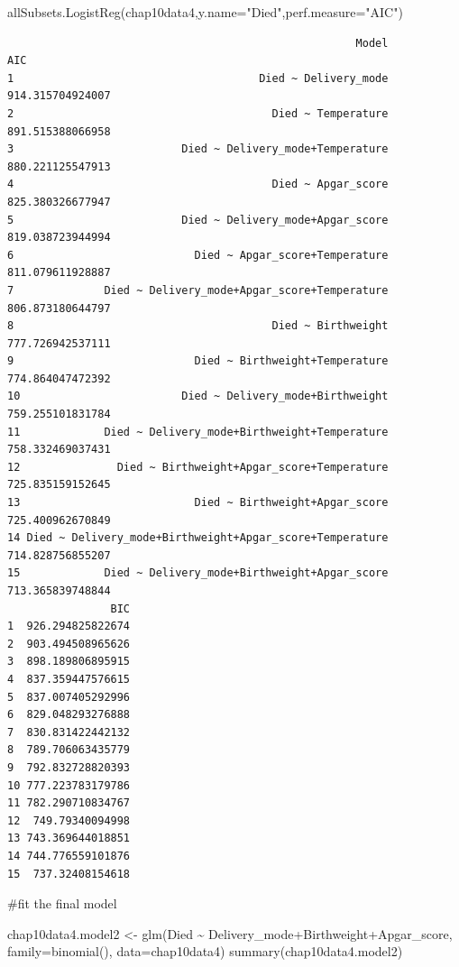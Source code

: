 \documentclass[
  letterpaper,
  DIV=11,
  numbers=noendperiod]{scrartcl}
\newenvironment{Shaded}{\begin{snugshade}}{\end{snugshade}}
\newcommand{\AttributeTok}[1]{\textcolor[rgb]{0.40,0.45,0.13}{#1}}
\newcommand{\FunctionTok}[1]{\textcolor[rgb]{0.28,0.35,0.67}{#1}}
\newcommand{\NormalTok}[1]{\textcolor[rgb]{0.00,0.23,0.31}{#1}}
\newcommand{\OtherTok}[1]{\textcolor[rgb]{0.00,0.23,0.31}{#1}}
\newcommand{\SpecialCharTok}[1]{\textcolor[rgb]{0.37,0.37,0.37}{#1}}
\newcommand{\StringTok}[1]{\textcolor[rgb]{0.13,0.47,0.30}{#1}}
\begin{document}
\begin{Shaded}
\begin{Highlighting}[]
\FunctionTok{allSubsets.LogistReg}\NormalTok{(chap10data4,}\AttributeTok{y.name=}\StringTok{"Died"}\NormalTok{,}\AttributeTok{perf.measure=}\StringTok{"AIC"}\NormalTok{)}
\end{Highlighting}
\end{Shaded}

\begin{verbatim}
                                                      Model              AIC
1                                      Died ~ Delivery_mode 914.315704924007
2                                        Died ~ Temperature 891.515388066958
3                          Died ~ Delivery_mode+Temperature 880.221125547913
4                                        Died ~ Apgar_score 825.380326677947
5                          Died ~ Delivery_mode+Apgar_score 819.038723944994
6                            Died ~ Apgar_score+Temperature 811.079611928887
7              Died ~ Delivery_mode+Apgar_score+Temperature 806.873180644797
8                                        Died ~ Birthweight 777.726942537111
9                            Died ~ Birthweight+Temperature 774.864047472392
10                         Died ~ Delivery_mode+Birthweight 759.255101831784
11             Died ~ Delivery_mode+Birthweight+Temperature 758.332469037431
12               Died ~ Birthweight+Apgar_score+Temperature 725.835159152645
13                           Died ~ Birthweight+Apgar_score 725.400962670849
14 Died ~ Delivery_mode+Birthweight+Apgar_score+Temperature 714.828756855207
15             Died ~ Delivery_mode+Birthweight+Apgar_score 713.365839748844
                BIC
1  926.294825822674
2  903.494508965626
3  898.189806895915
4  837.359447576615
5  837.007405292996
6  829.048293276888
7  830.831422442132
8  789.706063435779
9  792.832728820393
10 777.223783179786
11 782.290710834767
12  749.79340094998
13 743.369644018851
14 744.776559101876
15  737.32408154618
\end{verbatim}

\#fit the final model

\begin{Shaded}
\begin{Highlighting}[]
\NormalTok{chap10data4.model2 }\OtherTok{\textless{}{-}} \FunctionTok{glm}\NormalTok{(Died }\SpecialCharTok{\textasciitilde{}}\NormalTok{ Delivery\_mode}\SpecialCharTok{+}\NormalTok{Birthweight}\SpecialCharTok{+}\NormalTok{Apgar\_score, }\AttributeTok{family=}\FunctionTok{binomial}\NormalTok{(), }\AttributeTok{data=}\NormalTok{chap10data4)}
\FunctionTok{summary}\NormalTok{(chap10data4.model2)}
\end{Highlighting}
\end{Shaded}
\end{document}
